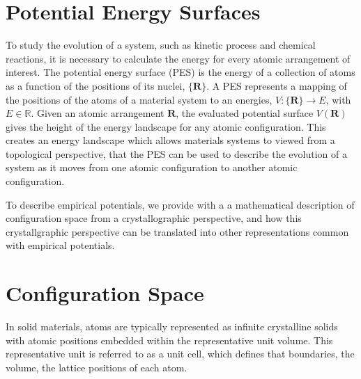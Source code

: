 \section{Potential Energy Surfaces}

To study the evolution of a system, such as kinetic process and chemical reactions, it is necessary to calculate the energy for every atomic arrangement of interest.  The potential energy surface (PES) is the energy of a collection of atoms as a function of the positions of its nuclei, $\{\bm{R}\}$.
A PES represents a mapping of the positions of the atoms of a material system to an energies, $V:\{\bm{R}\}\rightarrow E$, with $E\in\mathbb{R}$.
Given an atomic arrangement $\bm{R}$, the evaluated potential surface $V(\bm{R})$ gives the height of the energy landscape for any atomic configuration. 
This creates an energy landscape which allows materials systems to viewed from a topological perspective, that the PES can be used to describe the evolution of a system as it moves from one atomic configuration to another atomic configuration.

To describe empirical potentials, we provide with a a mathematical description of configuration space from a crystallographic perspective, and how this crystallgraphic perspective can be translated into other representations common with empirical potentials.

\section{Configuration Space}
In solid materials, atoms are typically represented as infinite crystalline solids with atomic positions embedded within the representative unit volume.
This representative unit is referred to as a unit cell, which defines that boundaries, the volume, the lattice positions of each atom.

